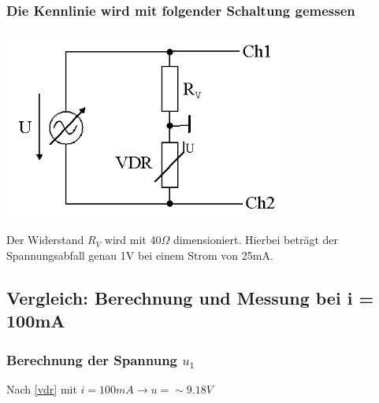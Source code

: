 \documentclass[11pt,a4paper,titlepage]{article}
\begin{document}
\subsubsection*{Die Kennlinie wird mit folgender Schaltung gemessen}
\begin{center}
\includegraphics[width=0.7\textwidth]{gep2v5_2}
\end{center}
Der Widerstand $R_V$ wird mit 40$\Omega$ dimensioniert. Hierbei betr\"agt der Spannungsabfall genau 1V bei einem Strom von 25mA.
\newpage
\subsection{Vergleich: Berechnung und Messung bei i = 100mA}
\subsubsection{Berechnung der Spannung $u_1$}
Nach \eqref{vdr} mit $i = 100mA \to u = \sim9.18V$
\end{document}
